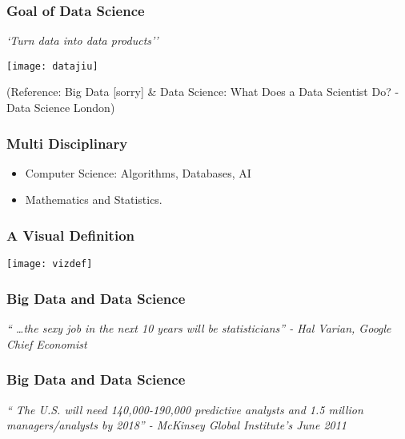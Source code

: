 \begin{frame}[fragile]\frametitle{Goal of Data Science}
\begin{center}
{\em `Turn data into data products''}

\texttt{[image: datajiu]}

\tiny{(Reference: Big Data [sorry] \& Data Science: What Does a Data Scientist Do? - Data Science London)}
\end{center}
\end{frame}

\begin{frame}[fragile]\frametitle{Multi Disciplinary}
\begin{itemize}
\item Computer Science: Algorithms, Databases, AI
\item Mathematics and Statistics.

\end{itemize}
\end{frame}

\begin{frame}[fragile]\frametitle{A Visual Definition}
\begin{center}
\texttt{[image: vizdef]}
\end{center}
\end{frame}

\begin{frame}[fragile]\frametitle{Big Data and Data Science}
\begin{center}
{\em `` \ldots the sexy job in the next 10 years will be statisticians'' - Hal Varian, Google Chief Economist}
\end{center}
\end{frame}

\begin{frame}[fragile]\frametitle{Big Data and Data Science}
\begin{center}
{\em `` The U.S. will need 140,000-190,000 predictive analysts and 1.5 million managers/analysts by 2018'' - McKinsey Global Institute's June 2011}
\end{center}
\end{frame}

